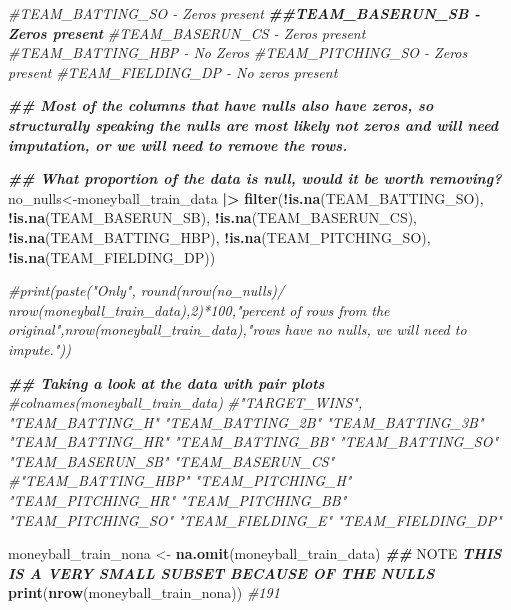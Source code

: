 \documentclass[
]{article}
\newenvironment{Shaded}{\begin{snugshade}}{\end{snugshade}}
\newcommand{\AlertTok}[1]{\textcolor[rgb]{0.94,0.16,0.16}{#1}}
\newcommand{\CommentTok}[1]{\textcolor[rgb]{0.56,0.35,0.01}{\textit{#1}}}
\newcommand{\DocumentationTok}[1]{\textcolor[rgb]{0.56,0.35,0.01}{\textbf{\textit{#1}}}}
\newcommand{\FunctionTok}[1]{\textcolor[rgb]{0.13,0.29,0.53}{\textbf{#1}}}
\newcommand{\NormalTok}[1]{#1}
\newcommand{\OtherTok}[1]{\textcolor[rgb]{0.56,0.35,0.01}{#1}}
\newcommand{\SpecialCharTok}[1]{\textcolor[rgb]{0.81,0.36,0.00}{\textbf{#1}}}
\begin{document}
\begin{Shaded}
\begin{Highlighting}[]
\CommentTok{\#TEAM\_BATTING\_SO {-} Zeros present}
\DocumentationTok{\#\#TEAM\_BASERUN\_SB {-} Zeros present}
\CommentTok{\#TEAM\_BASERUN\_CS {-} Zeros present}
\CommentTok{\#TEAM\_BATTING\_HBP {-} No Zeros}
\CommentTok{\#TEAM\_PITCHING\_SO {-} Zeros present }
\CommentTok{\#TEAM\_FIELDING\_DP {-} No zeros present}

\DocumentationTok{\#\# Most of the columns that have nulls also have zeros, so structurally speaking the nulls are most likely not zeros and will need imputation, or we will need to remove the rows.}

\DocumentationTok{\#\# What proportion of the data is null, would it be worth removing? }
\NormalTok{no\_nulls}\OtherTok{\textless{}{-}}\NormalTok{moneyball\_train\_data }\SpecialCharTok{|\textgreater{}} 
  \FunctionTok{filter}\NormalTok{(}\SpecialCharTok{!}\FunctionTok{is.na}\NormalTok{(TEAM\_BATTING\_SO),}
         \SpecialCharTok{!}\FunctionTok{is.na}\NormalTok{(TEAM\_BASERUN\_SB),}
         \SpecialCharTok{!}\FunctionTok{is.na}\NormalTok{(TEAM\_BASERUN\_CS),}
         \SpecialCharTok{!}\FunctionTok{is.na}\NormalTok{(TEAM\_BATTING\_HBP),}
         \SpecialCharTok{!}\FunctionTok{is.na}\NormalTok{(TEAM\_PITCHING\_SO),}
         \SpecialCharTok{!}\FunctionTok{is.na}\NormalTok{(TEAM\_FIELDING\_DP))}


\CommentTok{\#print(paste("Only", round(nrow(no\_nulls)/ nrow(moneyball\_train\_data),2)*100,"percent of rows from the original",nrow(moneyball\_train\_data),"rows have no nulls, we will need to impute."))}
\end{Highlighting}
\end{Shaded}

\begin{Shaded}
\begin{Highlighting}[]
\DocumentationTok{\#\# Taking a look at the data with pair plots }
\CommentTok{\#colnames(moneyball\_train\_data)}
\CommentTok{\#"TARGET\_WINS", "TEAM\_BATTING\_H"   "TEAM\_BATTING\_2B"  "TEAM\_BATTING\_3B"  "TEAM\_BATTING\_HR"  "TEAM\_BATTING\_BB"  "TEAM\_BATTING\_SO" "TEAM\_BASERUN\_SB"  "TEAM\_BASERUN\_CS"  \#"TEAM\_BATTING\_HBP" "TEAM\_PITCHING\_H"  "TEAM\_PITCHING\_HR" "TEAM\_PITCHING\_BB" "TEAM\_PITCHING\_SO" "TEAM\_FIELDING\_E" "TEAM\_FIELDING\_DP"}

\NormalTok{moneyball\_train\_nona }\OtherTok{\textless{}{-}} \FunctionTok{na.omit}\NormalTok{(moneyball\_train\_data)}
\DocumentationTok{\#\# }\AlertTok{NOTE}\DocumentationTok{ THIS IS A VERY SMALL SUBSET BECAUSE OF THE NULLS }
\FunctionTok{print}\NormalTok{(}\FunctionTok{nrow}\NormalTok{(moneyball\_train\_nona)) }\CommentTok{\#191}
\end{Highlighting}
\end{Shaded}
\end{document}
